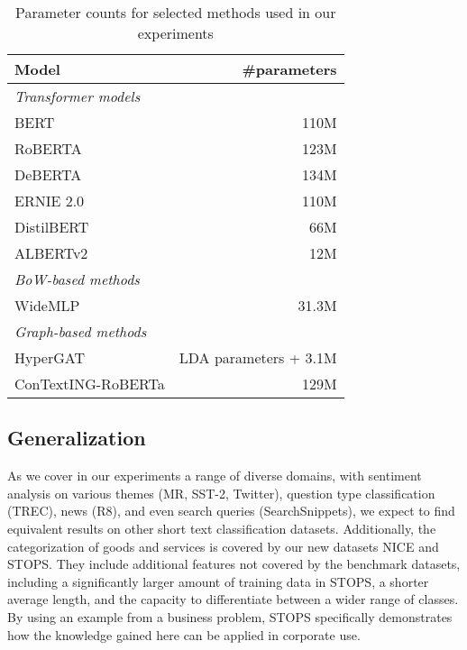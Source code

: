 \documentclass[runningheads]{llncs}
\begin{document}
\begin{table}[ht]
   \small
    \centering
    \caption{Parameter counts for selected methods used in our experiments}\label{tab:num_params}
    \begin{tabular}{lr}
    \toprule
    \textbf{Model} & \textbf{\#parameters}  \\
    \midrule

\textit{Transformer models} &  \\
         BERT & 110M\\
         RoBERTA  & 123M\\
         DeBERTA  & 134M\\
         ERNIE 2.0 & 110M \\   
         DistilBERT  & 66M\\
         ALBERTv2 & 12M \\         

    \midrule

    \textit{BoW-based methods} & \\
         WideMLP  & 31.3M\\
    \midrule

    \multicolumn{2}{l}{    \textit{Graph-based methods}  }\\
        HyperGAT & LDA parameters + 3.1M\\
         ConTextING-RoBERTa & 129M \\

     \bottomrule
    \end{tabular}
\end{table}

\subsection{Generalization}
\label{sec:generalization}

As we cover in our experiments a range of diverse domains, with sentiment analysis on various themes (MR, SST-2, Twitter), question type classification (TREC), news (R8), and even search queries (SearchSnippets), we expect to find equivalent results on other short text classification datasets.
Additionally, the categorization of goods and services is covered by our new datasets NICE and STOPS. They include additional features not covered by the benchmark datasets, including a significantly larger amount of training data in STOPS, a shorter average length, and the capacity to differentiate between a wider range of classes.
By using an example from a business problem, STOPS specifically demonstrates how the knowledge gained here can be applied in corporate use.
\end{document}
